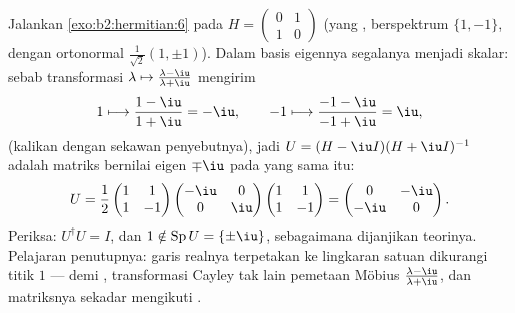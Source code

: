 \begin{example}\label{ex:b2:hermitian:cayleyrun}
Jalankan \cref{exo:b2:hermitian:6} pada $H = \begin{pmatrix} 0 & 1\\
1 & 0\end{pmatrix}$ (yang , berspektrum $\{1, -1\}$, dengan
 ortonormal $\frac{1}{\sqrt2}(1, \pm1)$). Dalam basis
eigennya segalanya menjadi skalar: sebab transformasi $\lambda
\mapsto \frac{\lambda - \iu}{\lambda + \iu}$ mengirim
\[
1 \longmapsto \frac{1 - \iu}{1 + \iu} = -\iu,
\qquad
-1 \longmapsto \frac{-1 - \iu}{-1 + \iu} = \iu ,
\]
(kalikan dengan sekawan penyebutnya), jadi $U = (H -
\iu I)(H + \iu I)^{-1}$ adalah matriks  bernilai eigen
$\mp\iu$ pada  yang sama itu:
\[
U = \frac{1}{2}\begin{pmatrix} 1 & 1\\ 1 & -1\end{pmatrix}
\begin{pmatrix} -\iu & 0\\ 0 & \iu\end{pmatrix}
\begin{pmatrix} 1 & 1\\ 1 & -1\end{pmatrix}
= \begin{pmatrix} 0 & -\iu\\ -\iu & 0\end{pmatrix} .
\]
Periksa: $U^\dagger U = I$, dan $1 \notin \operatorname{Sp}U =
\{\pm\iu\}$, sebagaimana dijanjikan teorinya. Pelajaran penutupnya: garis
realnya terpetakan ke lingkaran satuan dikurangi titik $1$ ---
 demi , transformasi Cayley tak lain
pemetaan Möbius $\frac{\lambda-\iu}{\lambda+\iu}$, dan matriksnya
sekadar mengikuti .
\end{example}

